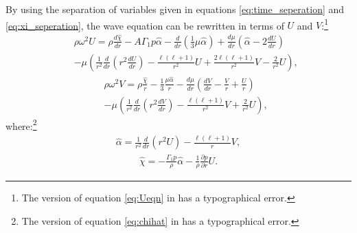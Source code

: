 \documentclass[fleqn,usenatbib]{mnras}
\begin{document}
By using the separation of variables given in equations \ref{eq:time_seperation} and \ref{eq:xi_seperation}, the wave equation can be rewritten in terms of $U$ and $V$:\footnote{The version of equation \ref{eq:Ueqn} in \citet{mcdermott1988nonradial} has a typographical error.} 
\begin{align}\nonumber
&&\rho\omega^2U=\rho\frac{d\hat{\chi}}{dr}-A\Gamma_1 p\hat{\alpha}-\frac{d}{dr}\left(\frac{1}{3}\mu\hat{\alpha}\right)+\frac{d\mu}{dr}\left(\hat{\alpha}-2\frac{dU}{dr}\right)\\
&&-\mu\left(\frac{1}{r^2}\frac{d}{dr}\left( r^2\frac{dU}{dr}\right)-\frac{\ell(\ell+1)}{r^2}U+\frac{2\ell(\ell+1)}{r^2}V-\frac{2}{r^2}U\right),
\label{eq:Ueqn}
\end{align}
\begin{align}\nonumber
&&\rho\omega^2V=\rho\frac{\hat{\chi}}{r}-\frac{1}{3}\frac{\mu\hat{\alpha}}{r}-\frac{d\mu}{dr}\left(\frac{dV}{dr}-\frac{V}{r}+\frac{U}{r}\right)\\
&&-\mu\left(\frac{1}{r^2}\frac{d}{dr}\left(r^2\frac{dV}{dr}\right)-\frac{\ell(\ell+1)}{r^2}V+\frac{2}{r^2}U\right),
\label{eq:Veqn}
\end{align}
\noindent where:\footnote{The version of equation \ref{eq:chihat} in \citet{mcdermott1988nonradial} has a typographical error.}
\begin{align}
\hat{\alpha}=\frac{1}{r^2}\frac{d}{dr}(r^2U)-\frac{\ell(\ell+1)}{r}V,
\label{eq:alphahat}
\end{align}
\begin{align}
\hat{\chi}=-\frac{\Gamma_1p}{\rho}\hat{\alpha}-\frac{1}{\rho}\frac{\partial p}{\partial r}U.
\label{eq:chihat}
\end{align}
\end{document}
